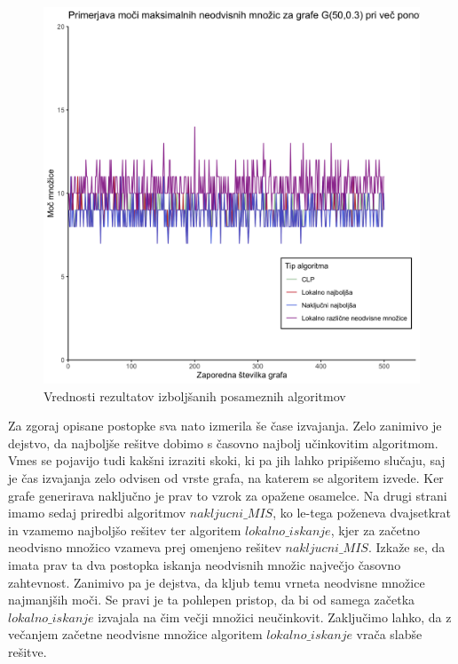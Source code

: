 \documentclass[a4paper, 12pt]{article}
\begin{document}
\begin{figure}[h!]
	\begin{center}
		\includegraphics[scale = 0.12]{R_koda/pon-moc-maximalno.png}
		\caption{Vrednosti rezultatov izboljšanih posameznih algoritmov}
	\end{center}
\end{figure}

\noindent Za zgoraj opisane postopke sva nato izmerila še čase izvajanja. Zelo zanimivo je dejstvo, da najboljše rešitve dobimo s časovno najbolj učinkovitim algoritmom.
Vmes se pojavijo tudi kakšni izraziti skoki, ki pa jih lahko pripišemo slučaju, saj je čas izvajanja zelo odvisen od vrste grafa, na katerem se algoritem izvede.
Ker grafe generirava naključno je prav to vzrok za opažene osamelce. Na drugi strani imamo sedaj priredbi algoritmov $nakljucni\_MIS$, ko le-tega poženeva dvajsetkrat in vzamemo najboljšo rešitev
ter algoritem $lokalno\_iskanje$, kjer za začetno neodvisno množico vzameva prej omenjeno rešitev $nakljucni\_MIS$. Izkaže se, da imata prav ta dva postopka iskanja neodvisnih množic največjo časovno zahtevnost.
Zanimivo pa je dejstva, da kljub temu vrneta neodvisne množice najmanjših moči. Se pravi je ta pohlepen pristop, da bi od samega začetka $lokalno\_iskanje$ izvajala na čim večji množici neučinkovit.
Zaključimo lahko, da z večanjem začetne neodvisne množice algoritem $lokalno\_iskanje$ vrača slabše rešitve.
\end{document}
